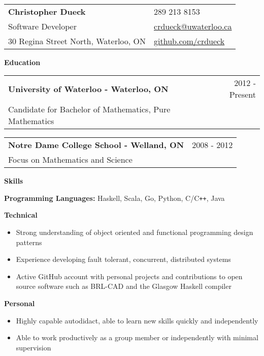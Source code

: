 \documentclass[10pt]{article}
\makeatletter
\newcommand{\resheader}[6]{\
\begin{tabular*}{7in}{l@{\extracolsep{\fill}}l}
    \textbf{\huge #1} & {\large #2}
    \vspace{4pt} \\
    {\large #3} & {\large #4}
    \vspace{4pt} \\
    {\large #5} & {\large #6}
\end{tabular*}\vspace{4pt}}
\newcommand{\resheading}[1]{{\large \colorbox{headercol}{\begin{minipage}{\textwidth}{\textbf{#1 \vphantom{p\^{E}}}}\end{minipage}}}}
\newcommand{\ressubheading}[3]{\item
\begin{tabular*}{7in}{l@{\extracolsep{\fill}}r}
    \textbf{#1} & #2 \\ #3
\end{tabular*}\vspace{-4pt}}
\newcommand{\resitem}[2]{\item{\textbf{#1} #2}}
\newcommand{\phone}{{\Large\faPhoneSign} 289 213 8153}
\newcommand{\email}{{\Large\faEnvelopeAlt} \href{mailto:crdueck@uwaterloo.ca}{crdueck@uwaterloo.ca}}
\newcommand{\github}{{\Large\faGithub} \href{https://github.com/crdueck}{github.com/crdueck}}
\makeatother
\begin{document}
\resheader
    {Christopher Dueck}                    \phone
    {Software Developer}                   \email
    {30 Regina Street North, Waterloo, ON} \github

\resheading{Education}
\begin{description}
    \ressubheading{University of Waterloo - Waterloo, ON} {2012 - Present}
    {Candidate for Bachelor of Mathematics, Pure Mathematics}
    \ressubheading{Notre Dame College School - Welland, ON} {2008 - 2012}
    {Focus on Mathematics and Science}
\end{description}

\resheading{Skills}
\begin{description}
    \resitem{Programming Languages:} {Haskell, Scala, Go, Python, C/C\texttt{++}, Java}
    \resitem{Technical}{\vspace{-4pt}
    \begin{itemize}
            \item{Strong understanding of object oriented and functional programming design patterns}
            \item{Experience developing fault tolerant, concurrent, distributed systems}
            \item{Active GitHub account with personal projects and contributions to open source software such as BRL-CAD and the Glasgow Haskell compiler}
    \end{itemize}}
    \resitem{Personal}{\vspace{-4pt}
    \begin{itemize}
        \item{Highly capable autodidact, able to learn new skills quickly and independently}
        \item{Able to work productively as a group member or independently with minimal supervision}
    \end{itemize}}
\end{description}
\end{document}
